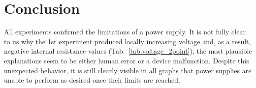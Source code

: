 \section{Conclusion}

All experiments confirmed the limitations of a power supply. It is not fully clear to us why the 1st experiment produced locally increasing voltage and, as a result, negative internal resistance values (Tab.~\ref{tab:voltage_2point}); the most plausible explanations seem to be either human error or a device malfunction. Despite this unexpected behavior, it is still clearly visible in all graphs that power supplies are unable to perform as desired once their limits are reached.